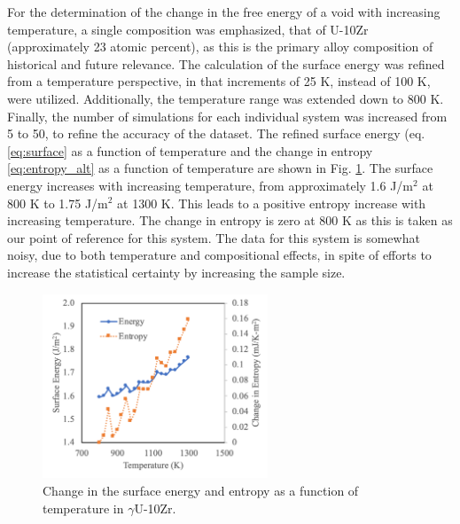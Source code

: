 \documentclass[review]{elsarticle}
\begin{document}
For the determination of the change in the free energy of a void with increasing temperature, a single composition was emphasized, that of U-10Zr (approximately 23 atomic percent), as this is the primary alloy composition of historical and future relevance. The calculation of the surface energy was refined from a temperature perspective, in that increments of 25 K, instead of 100 K, were utilized. Additionally, the temperature range was extended down to 800 K. Finally, the number of simulations for each individual system was increased from 5 to 50, to refine the accuracy of the dataset. The refined surface energy (eq. \ref{eq:surface} as a function of temperature and the change in entropy \ref{eq:entropy_alt} as a function of temperature are shown in Fig. \ref{fig:u23void}. The surface energy increases with increasing temperature, from approximately 1.6 J/m$^2$ at 800 K to 1.75 J/m$^2$ at 1300 K. This leads to a positive entropy increase with increasing temperature. The change in entropy is zero at 800 K as this is taken as our point of reference for this system. The data for this system is somewhat noisy, due to both temperature and compositional effects, in spite of efforts to increase the statistical certainty by increasing the sample size. 
\begin{figure}[!htp]
\begin{center}
\includegraphics[width=0.6\textwidth]{9_u23void}
\end{center}
\caption{Change in the surface energy and entropy as a function of temperature in $\gamma$U-10Zr.}
\label{fig:u23void}
\end{figure}
\end{document}
